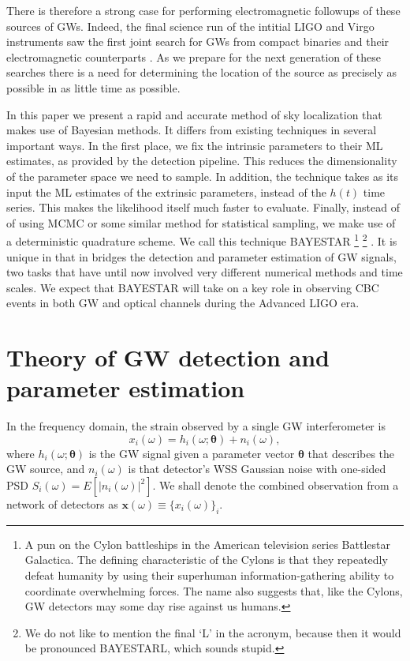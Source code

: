 \documentclass{iopart}
\begin{document}
There is therefore a strong case for performing electromagnetic followups of these sources of \acp{GW}. Indeed, the final science run of the intitial LIGO and Virgo instruments saw the first joint search for \acp{GW} from compact binaries and their electromagnetic counterparts \cite{abadie2012first}.  As we prepare for the next generation of these searches there is a need for determining the location of the source as precisely as possible in as little time as possible.

In this paper we present a rapid and accurate method of sky localization that makes use of Bayesian methods. It differs from existing techniques in several important ways.  In the first place, we fix the intrinsic parameters to their \ac{ML} estimates, as provided by the detection pipeline.  This reduces the dimensionality of the parameter space we need to sample. In addition, the technique takes as its input the \ac{ML} estimates of the extrinsic parameters, instead of the $h(t)$ time series. This makes the likelihood itself much faster to evaluate. Finally, instead of of using \ac{MCMC} or some similar method for statistical sampling, we make use of a deterministic quadrature scheme. We call this technique \ac{BAYESTAR}%
%
\footnote{A pun on the Cylon battleships in the American television series Battlestar Galactica. The defining characteristic of the Cylons is that they repeatedly defeat humanity by using their superhuman information\nobreakdashes-gathering ability to coordinate overwhelming forces. The name also suggests that, like the Cylons, \ac{GW} detectors may some day rise against us humans.}%
%
\footnote{We do not like to mention the final `L' in the acronym, because then it would be pronounced BAYESTARL, which sounds stupid.}%
. It is unique in that in bridges the detection and parameter estimation of \ac{GW} signals, two tasks that have until now involved very different numerical methods and time scales. We expect that \ac{BAYESTAR} will take on a key role in observing \ac{CBC} events in both \ac{GW} and optical channels during the Advanced \ac{LIGO} era.

\section{Theory of \ac{GW} detection and parameter estimation}

In the frequency domain, the strain observed by a single \ac{GW} interferometer is
%
\begin{equation}\label{eq:signal-model}
    x_i (\omega) = h_i (\omega; \boldsymbol\theta) + n_i (\omega),
\end{equation}
%
where $h_i (\omega; \boldsymbol\theta)$ is the \ac{GW} signal given a parameter vector $\boldsymbol\theta$ that describes the \ac{GW} source, and $n_i (\omega)$ is that detector's \ac{WSS} Gaussian noise with one\nobreakdashes-sided \ac{PSD} $S_i(\omega) = E\left[\left|n_i(\omega)\right|^2\right]$. We shall denote the combined observation from a network of detectors as $\mathbf x (\omega) \equiv \{x_i (\omega)\}_i$.
\end{document}
